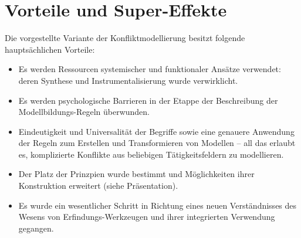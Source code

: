 \documentclass[11pt,a4paper]{article}
\begin{document}
\section*{Vorteile und Super-Effekte}
Die vorgestellte Variante der Konfliktmodellierung besitzt folgende
hauptsächlichen Vorteile:
\begin{itemize}
\item Es werden Ressourcen systemischer und funktionaler Ansätze verwendet:
  deren Synthese und Instrumentalisierung wurde verwirklicht.
\item Es werden psychologische Barrieren in der Etappe der Beschreibung der
  Modellbildungs-Regeln überwunden.
\item Eindeutigkeit und Universalität der Begriffe sowie eine genauere
  Anwendung der Regeln zum Erstellen und Transformieren von Modellen -- all
  das erlaubt es, komplizierte Konflikte aus beliebigen Tätigkeitsfeldern zu
  modellieren.
\item Der Platz der Prinzpien wurde bestimmt und Möglichkeiten ihrer
  Konstruktion erweitert (siehe Präsentation).
\item Es wurde ein wesentlicher Schritt in Richtung eines neuen Verständnisses
  des Wesens von Erfindungs-Werkzeugen und ihrer integrierten Verwendung
  gegangen.
\end{itemize}
\end{document}
